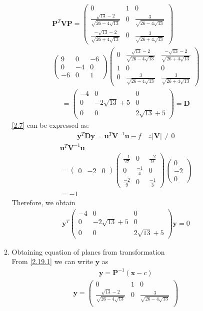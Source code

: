 \documentclass[journal,12pt,twocolumn]{IEEEtran}
\let\vec\mathbf
\numberwithin{equation}{subsection}
\newcommand{\myvec}[1]{\ensuremath{\begin{pmatrix}#1\end{pmatrix}}}
\begin{document}
\begin{enumerate}
\begin{enumerate}
\begin{multline}
\vec{P}^T\vec{V}\vec{P}= \myvec{0&1&0\\
\frac{\sqrt{13} -2}{\sqrt{26-4\sqrt{13}}}&0&\frac{3}{\sqrt{26-4\sqrt{13}}}\\
\frac{-\sqrt{13} -2}{\sqrt{26+4\sqrt{13}}}&0&\frac{3}{\sqrt{26+4\sqrt{13}}}
}  \\ \myvec{9&0&-6\\0&-4&0\\-6&0&1}   
\myvec{0 &\frac{\sqrt{13} -2}{\sqrt{26-4\sqrt{13}}}&\frac{-\sqrt{13} -2}{\sqrt{26+4\sqrt{13}}}\\1 &0&0\\0&\frac{3}{\sqrt{26-4\sqrt{13}}}&\frac{3}{\sqrt{26+4\sqrt{13}}}}
\end{multline}
\begin{align}
=\myvec{-4&0&0\\0&-2\sqrt{13}+5&0\\0&0&2\sqrt{13}+5} = \vec{D}
\end{align}
 \eqref{2.7}  can be expressed as:
\begin{align}
\vec{y}^T\vec{D}\vec{y} = \vec{u}^T\vec{V}^{-1}\vec{u} -f   \quad     \wasytherefore |\vec{V}| \neq 0
\end{align}
\begin{multline}
\vec{u}^T\vec{V}^{-1}\vec{u} \\= \myvec{0&-2&0} \myvec{\frac{-1}{27} & 0 &\frac{-2}{9}\\ 0 & \frac{-1}{4} & 0 \\ \frac{-2}{9} & 0 &\frac{-1}{3}}\myvec{0\\-2\\0}\\=-1
\end{multline}
Therefore, we obtain
\begin{align}
\vec{y}^T\myvec{-4&0&0\\0&-2\sqrt{13}+5&0\\0&0&2\sqrt{13}+5}\vec{y} = 0  \label{2.27.1}
\end{align}
\item Obtaining equation of planes from transformation\\
From \eqref{2.19.1} we can write $\vec{y}$ as
\begin{align}
\vec{y} = \vec{P}^{-1}(\vec{x} - c)
\end{align}
\begin{align}
\vec{y} =  \myvec{0&1&0\\
\frac{\sqrt{13} -2}{\sqrt{26-4\sqrt{13}}}&0&\frac{3}{\sqrt{26-4\sqrt{13}}}\\
}
\end{align}
\end{enumerate}
\end{enumerate}
\end{document}
